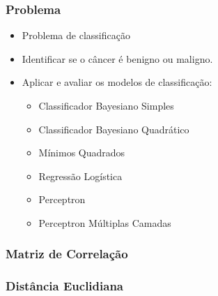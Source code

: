 \documentclass{beamer}
\begin{document}
\begin{frame}
\frametitle{Problema}
\begin{itemize}
\item Problema de classificação
\item Identificar se o câncer é benigno ou maligno.
\item Aplicar e avaliar os modelos de classificação:
\begin{itemize}
\item Classificador Bayesiano Simples
\item Classificador Bayesiano Quadrático
\item Mínimos Quadrados
\item Regressão Logística
\item Perceptron
\item Perceptron Múltiplas Camadas
\end{itemize}
\end{itemize}
\end{frame}



\begin{frame}
\frametitle{Matriz de Correlação}
\begin{figure}[H]
    \centering
    \label{fig:corrcoef}
\end{figure}
\end{frame}


\begin{frame}
\frametitle{Distância Euclidiana}
\begin{figure}[H]
    \centering
    \label{fig:corrcoef}
\end{figure}
\end{frame}
\end{document}
